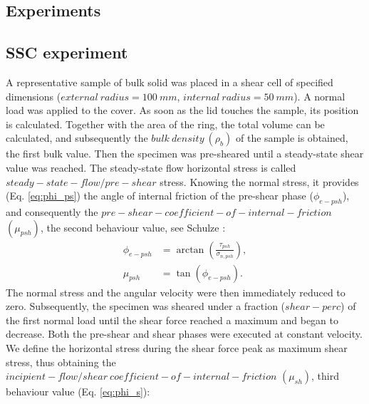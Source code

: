 \documentclass[review]{elsarticle}
\begin{document}
\begin{appendix}
\section{Experiments}
\label{sec:appexperiments}

\subsection{SSC experiment}
\label{subsec:srsctexperiment}
A representative sample of bulk solid was placed in a shear cell of specified
dimensions ($external ~ radius = 100 ~ mm$, $internal ~ radius = 50 ~ mm$).
A normal load was applied to the cover. As soon as the lid touches the sample, its position is calculated.
Together with the area of the ring, the total volume can be calculated, and subsequently the $bulk ~ density ~ (\rho_b)$ 
of the sample is obtained, the first bulk value.
Then the specimen was pre-sheared until a steady-state shear value was reached.
The steady-state flow horizontal stress
is called $steady-state-flow/pre-shear$ stress.
Knowing the normal stress, it provides (Eq. \ref{eq:phi_ps}) the angle of
internal friction of the pre-shear phase ($\phi_{e-psh}$), and consequently the
$pre-shear-coefficient-of-internal-friction $ $ (\mu_{psh})$, the second
behaviour value, see Schulze \cite{RefWorks:118}:
\begin{equation}
\begin{aligned}
\phi_{e-psh} &= \arctan \left(\frac{\tau_{psh}}{\sigma_{n,psh}} \right) ,\\
\mu_{psh} &=\tan(\phi_{e-psh}) .
\end{aligned}
 \label{eq:phi_ps}
\end{equation}
The normal stress and the angular velocity were then immediately reduced to zero. 
Subsequently, the specimen was sheared under a fraction ($shear-perc$) of the first normal load until the shear force 
reached a maximum and began to decrease. 
Both the pre-shear and shear phases were executed at constant velocity. 
We define the horizontal stress during the shear force peak as maximum shear stress, 
thus obtaining the $incipient-flow/shear ~ coefficient-of-internal-friction $ $
(\mu_{sh})$, third behaviour value (Eq. \ref{eq:phi_s})\cite{RefWorks:118}:
\begin{equation}
\begin{aligned}

\end{aligned}
\end{equation}
\end{appendix}
\end{document}
